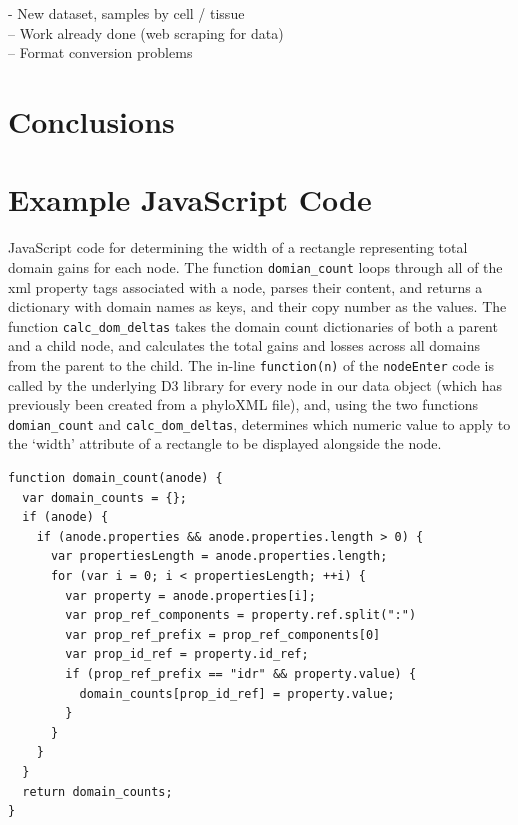 \documentclass[12pt,a4paper]{article}
\begin{document}
- New dataset, samples by cell / tissue\\
-- Work already done (web scraping for data)\\
-- Format conversion problems\\


\section{Conclusions}
\label{sec:conclusions}

\newpage
\appendix
\section{Example JavaScript Code}
\label{sec:gains_js_code}
JavaScript code for determining the width of a rectangle representing total domain gains for each node. The function \texttt{domian\_count} loops through all of the xml property tags associated with a node, parses their content, and returns a dictionary with domain names as keys, and their copy number as the values. The function \texttt{calc\_dom\_deltas} takes the domain count dictionaries of both a parent and a child node, and calculates the total gains and losses across all domains from the parent to the child. The in-line \texttt{function(n)} of the \texttt{nodeEnter} code is called by the underlying D3 library for every node in our data object (which has previously been created from a phyloXML file), and, using the two functions \texttt{domian\_count} and \texttt{calc\_dom\_deltas}, determines which numeric value to apply to the `width' attribute of a rectangle to be displayed alongside the node.
\singlespace
\footnotesize
\begin{verbatim}
function domain_count(anode) {
  var domain_counts = {};
  if (anode) {
    if (anode.properties && anode.properties.length > 0) {
      var propertiesLength = anode.properties.length;
      for (var i = 0; i < propertiesLength; ++i) {
        var property = anode.properties[i];
        var prop_ref_components = property.ref.split(":")
        var prop_ref_prefix = prop_ref_components[0]
        var prop_id_ref = property.id_ref;
        if (prop_ref_prefix == "idr" && property.value) {
          domain_counts[prop_id_ref] = property.value;
        }
      }
    }
  }
  return domain_counts;
}
\end{verbatim}
\newpage
\end{document}
